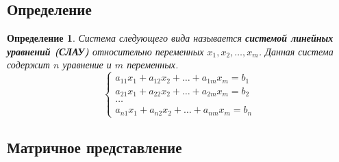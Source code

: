 \documentclass[]{article}
\newtheorem{dfn}{Определение}
\begin{document}
\subsection{Определение}
\begin{dfn}
Система следующего вида называется \textbf{системой линейных уравнений (СЛАУ)} относительно переменных $x_1,x_2,\ldots,x_m$. Данная система содержит $n$ уравнение и $m$ переменных.
\begin{equation*}
\begin{cases}
	a_{11}x_1 + a_{12}x_2 + \ldots + a_{1m}x_m=b_1
	\\
	a_{21}x_1 + a_{22}x_2 + \ldots + a_{2m}x_m=b_2
	\\
	\ldots
	\\
	a_{n1}x_1 + a_{n2}x_2 + \ldots + a_{nm}x_m=b_n
\end{cases}
\end{equation*}
\end{dfn}
\subsection{Матричное представление}
\end{document}
